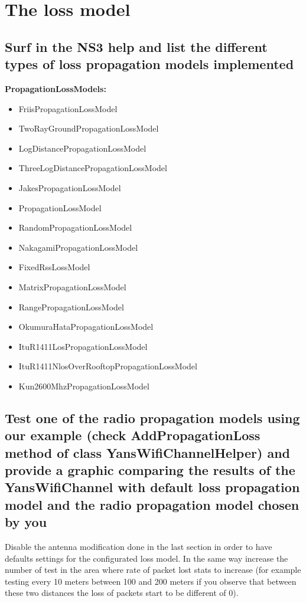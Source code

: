 \documentclass[a4paper,10pt]{article}
\begin{document}
\section{The loss model}

\subsection{Surf in the NS3 help and list the different types of loss propagation models implemented}

\singlespacing
\textbf{PropagationLossModels:}

\begin{itemize}
  \item FriisPropagationLossModel
  \item TwoRayGroundPropagationLossModel
  \item LogDistancePropagationLossModel
  \item ThreeLogDistancePropagationLossModel
  \item JakesPropagationLossModel
  \item PropagationLossModel
  \item RandomPropagationLossModel
  \item NakagamiPropagationLossModel
  \item FixedRssLossModel
  \item MatrixPropagationLossModel
  \item RangePropagationLossModel
  \item OkumuraHataPropagationLossModel
  \item ItuR1411LosPropagationLossModel
  \item ItuR1411NlosOverRooftopPropagationLossModel
  \item Kun2600MhzPropagationLossModel

\end{itemize}

\subsection{Test one of the radio propagation models using our example (check AddPropagationLoss method of
class YansWifiChannelHelper) and provide a graphic comparing the results of the YansWifiChannel
with default loss propagation model and the radio propagation model chosen by you}

\singlespacing
Disable the antenna modification done in the last section in order to have defaults settings for the
configurated loss model. In the same way increase the number of test in the area where rate of packet lost
stats to increase (for example testing every 10 meters between 100 and 200 meters if you observe that
between these two distances the loss of packets start to be different of 0).
\end{document}
